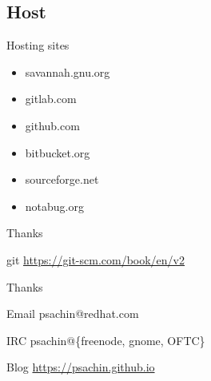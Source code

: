 \documentclass[10pt]{beamer}
\begin{document}
\subsection{Host}
\label{sec:orgb6f55a2}
\begin{frame}[label={sec:org46d9f1b}]{Hosting sites}
\begin{itemize}
\item savannah.gnu.org
\item gitlab.com
\item github.com
\item bitbucket.org
\item sourceforge.net
\item notabug.org
\end{itemize}
\end{frame}

\begin{frame}[label={sec:org0915c98}]{Thanks}
\begin{block}{git}
\url{https://git-scm.com/book/en/v2}
\end{block}
\end{frame}

\begin{frame}[label={sec:orgdbbcd57}]{Thanks}
\begin{block}{Email}
psachin@redhat.com
\end{block}
\begin{block}{IRC}
psachin@\{freenode, gnome, OFTC\}
\end{block}
\begin{block}{Blog}
\url{https://psachin.github.io}
\end{block}
\end{frame}
\end{document}
